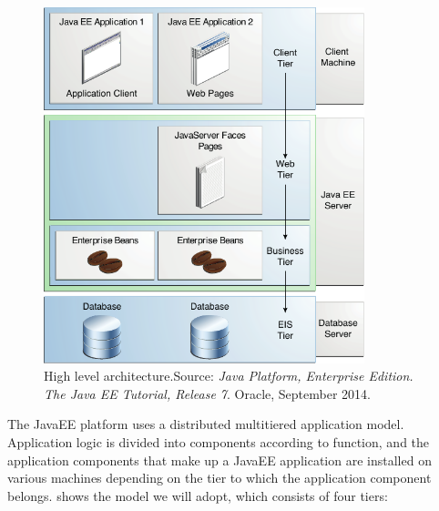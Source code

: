 \begin{figure}%
	\centering%
	\includegraphics[width=0.83\textwidth]{img/JEETT}%
	\caption{High level architecture.\hfill\break Source: \emph{Java Platform, Enterprise Edition. The Java EE Tutorial, Release 7}. Oracle, September 2014.}\label{fig:jeett}%
\end{figure}

The JavaEE platform uses a distributed multitiered application model. Application logic is divided into components according to function, and the application components that make up a JavaEE application are installed on various machines depending on the tier to which the application component belongs.  shows the model we will adopt, which consists of four tiers:


